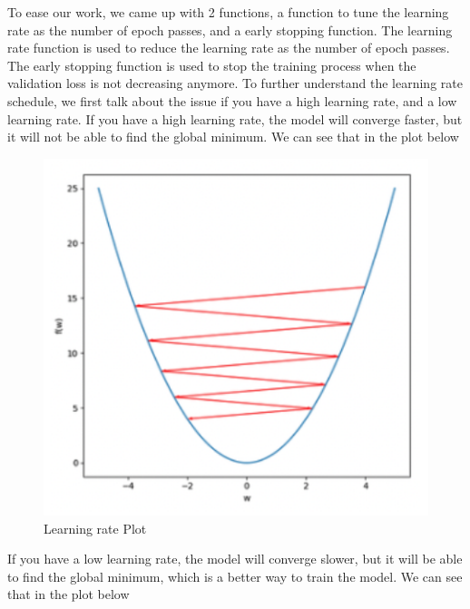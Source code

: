 To ease our work, we came up with 2 functions, a function to tune the learning rate as the number of epoch passes, and a early stopping function. The learning rate function is used to reduce the learning rate as the number of epoch passes. The early stopping function is used to stop the training process when the validation loss is not decreasing anymore. To further understand the learning rate schedule, we first talk about the issue if you have a high learning rate, and a low learning rate. If you have a high learning rate, the model will converge faster, but it will not be able to find the global minimum. We can see that in the plot below

\begin{figure}[h]
\centering
\includegraphics[scale=0.6]{lr-schedule-2.png}
\caption{Learning rate Plot}
\end{figure}

If you have a low learning rate, the model will converge slower, but it will be able to find the global minimum, which is a better way to train the model. We can see that in the plot below

